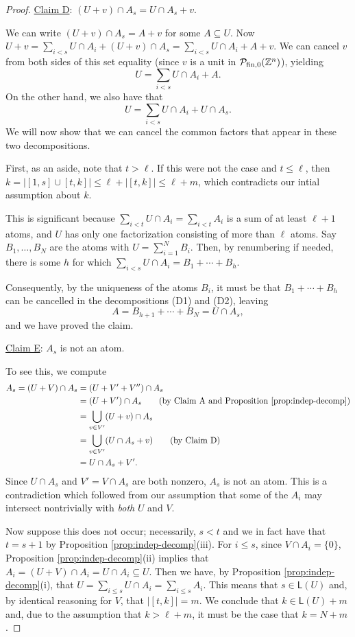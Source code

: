 \begin{proof}
	\noindent\underline{Claim D}: $(U+v)\cap A_s = U\cap A_s + v$. \label{cld}
	
	We can write $(U+v)\cap A_s = A + v$ for some $A \subseteq U$.
	Now $U+v = \sum_{i<s} U\cap A_i + (U+v)\cap A_s = \sum_{i<s} U\cap A_i + A + v$.
	We can cancel $v$ from both sides of this set equality (since $v$ is a unit in $\mathcal{P}_{\textrm{fin}, 0}(\mathbb{Z}^n)$), yielding
	\[ U = \sum_{i<s} U\cap A_i + A. \tag{D1}\]
	On the other hand, we also have that
	\[ U = \sum_{i<s} U\cap A_i + U\cap A_s. \tag{D2}\]
	We will now show that we can cancel the common factors that appear in these two decompositions.
	
	First, as an aside, note that $t > \ell$.
	If this were not the case and $t \le \ell$, then $k = | [ 1,s ] \cup [ t,k ] | \le \ell + | [ t,k ] | \le \ell+m$, which contradicts our intial assumption about $k$.
	
	This is significant because $\sum_{i<t} U\cap A_i = \sum_{i<t} A_i$ is a sum of at least $\ell+1$ atoms, and $U$ has only one factorization consisting of more than $\ell$ atoms.
	Say $B_1,\dots, B_{N}$ are the atoms with $U = \sum_{i=1}^{N} B_i$.
	Then, by renumbering if needed, there is some $h$ for which $\sum_{i<s} U\cap A_i = B_1 + \cdots + B_h$.
	
	Consequently, by the uniqueness of the atoms $B_i$, it must be that $B_1 +\cdots + B_h$ can be cancelled in the decompositions (D1) and (D2), leaving
	\[ A = B_{h+1} +\cdots+ B_{N} = U\cap A_s, \]
	and we have proved the claim.
	
	\noindent\underline{Claim E}: $A_s$ is not an atom. \label{cle}
	
	To see this, we compute
	\begin{align*}
	A_s = (U+V)\cap A_s 
	&= (U+V'+V'') \cap A_s \\
	&= (U+V') \cap A_s \tag{by Claim A and Proposition \ref{prop:indep-decomp}} \\
	&= \bigcup_{v\in V'} (U+v)\cap A_s \\
	&= \bigcup_{v\in V'} (U\cap A_s + v) \tag{by Claim D} \\
	&= U\cap A_s + V'.
	\end{align*}
	Since $U\cap A_s$ and $V' = V\cap A_s$ are both nonzero, $A_s$ is not an atom.
	This is a contradiction which followed from our assumption that some of the $A_i$ may intersect nontrivially with \textit{both} $U$ and $V$.
	
	Now suppose this does not occur; necessarily, $s < t$ and we in fact have that $t = s+1$ by Proposition \ref{prop:indep-decomp}(iii).
	For $i \le s$, since $V\cap A_i  = \{0\}$, Proposition \ref{prop:indep-decomp}(ii) implies that $A_i = (U+V)\cap A_i = U\cap A_i \subseteq U$.
	Then we have, by Proposition \ref{prop:indep-decomp}(i), that $U = \sum_{i\le s} U\cap A_i = \sum_{i\le s} A_i$.
	This means that $s\in \mathsf{L}(U)$ and, by identical reasoning for $V$, that $| [ t,k ]| = m$.
	We conclude that $k \in \mathsf{L}(U) + m$ and, due to the assumption that $k>\ell+m$, it must be the case that $k = N + m$.
\end{proof}


